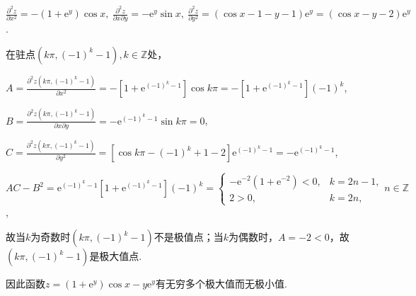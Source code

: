 \documentclass[12pt,UTF8]{ctexart}
\begin{document}
\begin{enumerate}
$\frac{\partial^2z}{\partial x^2}=-(1+\mathrm e^y)\cos x,\ \frac{\partial^2z}{\partial x\partial y}=-\mathrm e^y\sin x,\ \frac{\partial^2z}{\partial y^2}=(\cos x-1-y-1)\mathrm e^y=(\cos x-y-2)\mathrm e^y$.

在驻点$(k\pi,(-1)^k-1),k\in\mathbb Z$处，

$A=\frac{\partial^2z(k\pi,(-1)^k-1)}{\partial x^2}=-[1+\mathrm e^{(-1)^k-1}]\cos k\pi=-[1+\mathrm e^{(-1)^k-1}](-1)^k$,

$B=\frac{\partial^2z(k\pi,(-1)^k-1)}{\partial x\partial y}=-\mathrm e^{(-1)^k-1}\sin k\pi=0$,

$C=\frac{\partial^2z(k\pi,(-1)^k-1)}{\partial y^2}=[\cos k\pi-(-1)^k+1-2]\mathrm e^{(-1)^k-1}=-\mathrm e^{(-1)^k-1}$,

$AC-B^2=\mathrm e^{(-1)^k-1}[1+\mathrm e^{(-1)^k-1}](-1)^k=\begin{cases}
-\mathrm e^{-2}(1+\mathrm e^{-2})<0,&k=2n-1,\\
2>0,&k=2n,
\end{cases}n\in\mathbb Z$,

故当$k$为奇数时$(k\pi,(-1)^k-1)$不是极值点；当$k$为偶数时，$A=-2<0$，故$(k\pi,(-1)^k-1)$是极大值点.

因此函数$z=(1+\mathrm e^y)\cos x-y\mathrm e^y$有无穷多个极大值而无极小值.
\end{enumerate}
\end{document}
